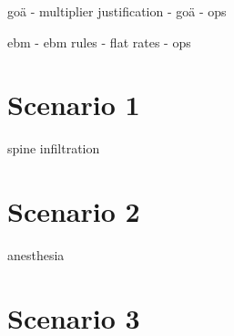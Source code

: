 

goä
- multiplier justification
- goä
- ops

ebm
- ebm rules
- flat rates
- ops



\section{Scenario 1}



spine infiltration


\section{Scenario 2}

anesthesia

\section{Scenario 3}


